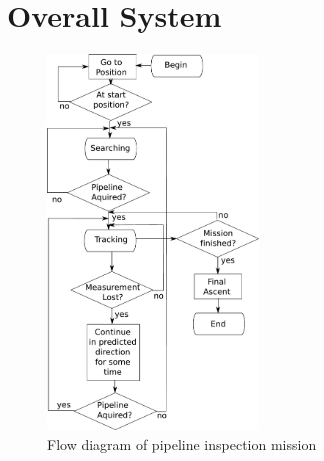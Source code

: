 \section{Overall System}
	\begin{figure}[htbp]
		\centering
		\includegraphics[width=0.5\textwidth]{pics/Operation}
		\caption{Flow diagram of pipeline inspection mission}
		\label{fig:ch2-flowdiagram}
	\end{figure}
	

